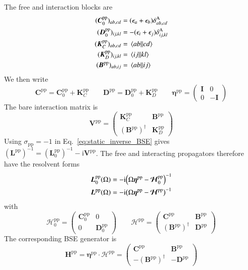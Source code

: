 \documentclass[aip,jcp,reprint,noshowkeys,superscriptaddress]{revtex4-1}
\newcommand{\pp}{\text{pp}}
\newcommand{\ii}{\mathrm{i}}
\newcommand{\bB}{\boldsymbol{B}}
\newcommand{\bC}{\boldsymbol{C}}
\newcommand{\bD}{\boldsymbol{D}}
\newcommand{\bH}{\boldsymbol{H}}
\newcommand{\bI}{\boldsymbol{I}}
\newcommand{\bK}{\boldsymbol{K}}
\newcommand{\bL}{\boldsymbol{L}}
\newcommand{\bV}{\boldsymbol{V}}
\newcommand{\bEta}{\boldsymbol{\eta}}
\newcommand{\bcalH}{\boldsymbol{\mathcal{H}}}
\begin{document}
The free and interaction blocks are
\begin{align}
    (\bC_0^{\pp})_{ab,cd}
    &=(\epsilon_a+\epsilon_b)\delta^{\rm A}_{ab,cd}
    \\
    (\bD_0^{\pp})_{ij,kl}
    &=-(\epsilon_i+\epsilon_j)\delta^{\rm A}_{ij,kl}
    \\
    (\bK_C^{\pp})_{ab,cd}
    &=\mel{ab}{}{cd}
    \\
    (\bK_D^{\pp})_{ij,kl}
    &=\mel{ij}{}{kl}
    \\
    (\bB^{\pp})_{ab,ij}
    &=\mel{ab}{}{ij}
\end{align}
We then write
\begin{equation*}
    \bC^{\pp}=\bC_0^{\pp}+\bK_C^{\pp}
    \qquad
    \bD^{\pp}=\bD_0^{\pp}+\bK_D^{\pp}
    \qquad
    \bEta^{\pp}=\begin{pmatrix}\bI&0\\0&-\bI\end{pmatrix}
\end{equation*}
The bare interaction matrix is
\begin{equation}
 \bV^{\pp}=\begin{pmatrix}
 \bK_C^{\pp}&\bB^{\pp}\\
 (\bB^{\pp})^{\dagger}&\bK_D^{\pp}
 \end{pmatrix}
 \label{eq:bare_static_pp_block}
\end{equation}
Using $\sigma_{\pp}=-1$ in Eq.~\eqref{eq:static_inverse_BSE} gives
$(\bL^{\pp})^{-1}=(\bL_0^{\pp})^{-1}-\ii\bV^{\pp}$.
The free and interacting propagators therefore have the resolvent forms
\begin{align}
    \bL_0^{\pp}(\Omega)
    &=-\ii\qty(\Omega\bEta^{\pp}-\bcalH_0^{\pp})^{-1}
    \\
    \bL^{\pp}(\Omega)
    &=-\ii\qty(\Omega\bEta^{\pp}-\bcalH^{\pp})^{-1}
\end{align}
with
\begin{equation*}
    \bcalH_0^{\pp}
    =
    \begin{pmatrix}
        \bC_0^{\pp}&0\\
        0&\bD_0^{\pp}
    \end{pmatrix}
    \qquad
    \bcalH^{\pp}
    =
    \begin{pmatrix}
        \bC^{\pp}&\bB^{\pp}\\
        (\bB^{\pp})^{\dagger}&\bD^{\pp}
    \end{pmatrix}
\end{equation*}
The corresponding BSE generator is
\begin{equation}
    \bH^{\pp}
    =
    \bEta^{\pp}\cdot\bcalH^{\pp}
    =
    \begin{pmatrix}
        \bC^{\pp}&\bB^{\pp}\\
        -(\bB^{\pp})^{\dagger}&-\bD^{\pp}
    \end{pmatrix}
    \label{eq:H_pp_from_frequency}
\end{equation}
\end{document}

